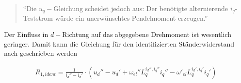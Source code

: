 \documentclass[conference,twocolumn]{IEEEtran}
\begin{document}
\begin{quote}
\enquote{Die $u_q-$Gleichung scheidet jedoch aus: Der benötigte alternierende $i_q$-Teststrom würde ein unerwünschtes Pendelmoment erzeugen.}\autocite[S.~148]{Kellner2012}
\end{quote}

Der Einfluss in $d-$Richtung auf das abgegebene Drehmoment ist wesentlich geringer.
Damit kann die Gleichung für den identifizierten Ständerwiderstand nach \textcite{Kellner2012} geschrieben werden

\begin{align}
R_{1,ident} = \frac{1}{i_d''-i_d'} \cdot \left( u_d'' - u_d' + \omega_{el}'' L_q^{i_d'',i_q''}i_q'' - \omega'_{el}L_q^{i_d',i_q'}i_q' \right)
\end{align}




%
%



%
%
\end{document}
